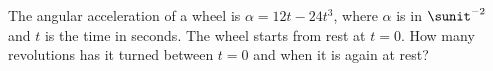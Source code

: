 The angular acceleration of a wheel  is $\alpha=12t -24t^3$,
where $\alpha$ is in $\sunit^{-2}$ and $t$ is the time in seconds. The wheel starts from rest
at $t = 0$. How many revolutions has it turned between $t = 0$ and
when it is again at rest?\answercheck
